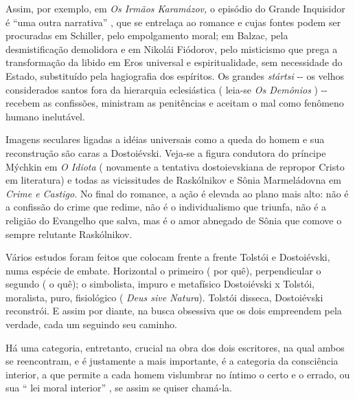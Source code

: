 Assim, por exemplo, em \emph{Os Irmãos Karamázov,} o episódio do Grande
Inquisidor é ``uma outra narrativa'' , que se entrelaça ao romance e
cujas fontes podem ser procuradas em Schiller, pelo empolgamento moral;
em Balzac, pela desmistificação demolidora e em Nikolái Fiódorov, pelo
misticismo que prega a transformação da libido em Eros universal e
espiritualidade, sem necessidade do Estado, substituído pela hagiografia
dos espíritos. Os grandes \emph{stártsi} -\/- os velhos considerados
santos fora da hierarquia eclesiástica ( leia-se \emph{Os Demônios} )
-\/- recebem as confissões, ministram as penitências e aceitam o mal
como fenômeno humano inelutável.

Imagens seculares ligadas a idéias universais como a queda do homem e
sua reconstrução são caras a Dostoiévski. Veja-se a figura condutora do
príncipe Mýchkin em \emph{O Idiota} ( novamente a tentativa
dostoievskiana de repropor Cristo em literatura) e todas as vicissitudes
de Raskólnikov e Sônia Marmeládovna em \emph{Crime e Castigo.} No final
do romance, a ação é elevada ao plano mais alto: não é a confissão do
crime que redime, não é o individualismo que triunfa, não é a religião
do Evangelho que salva, mas é o amor abnegado de Sônia que comove o
sempre relutante Raskólnikov.

Vários estudos foram feitos que colocam frente a frente Tolstói e
Dostoiévski, numa espécie de embate. Horizontal o primeiro ( por quê),
perpendicular o segundo ( o quê); o simbolista, impuro e metafísico
Dostoiévski x Tolstói, moralista, puro, fisiológico ( \emph{Deus sive
Natura}). Tolstói disseca, Dostoiévski reconstrói. E assim por diante,
na busca obsessiva que os dois empreendem pela verdade, cada um seguindo
seu caminho.

Há uma categoria, entretanto, crucial na obra dos dois escritores, na
qual ambos se reencontram, e é justamente a mais importante, é a
categoria da consciência interior, a que permite a cada homem vislumbrar
no íntimo o certo e o errado, ou sua `` lei moral interior'' , se assim
se quiser chamá-la.


